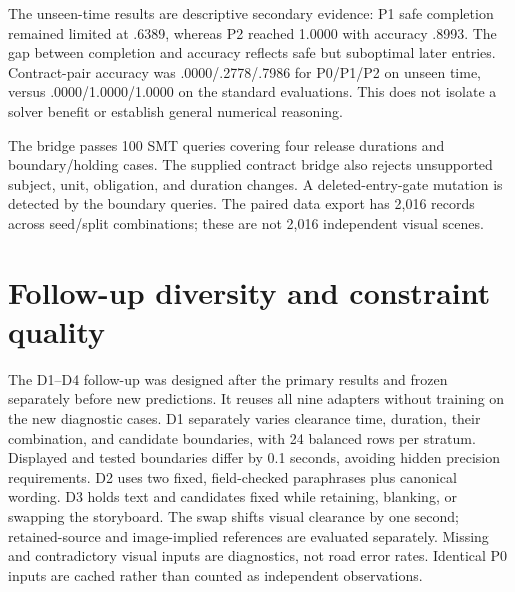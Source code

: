 \documentclass[11pt]{article}
\begin{document}
The unseen-time results are descriptive secondary evidence: P1 safe completion
remained limited at .6389, whereas P2 reached 1.0000 with accuracy .8993. The
gap between completion and accuracy reflects safe but suboptimal later entries.
Contract-pair accuracy was .0000/.2778/.7986 for P0/P1/P2 on unseen time, versus
.0000/1.0000/1.0000 on the standard evaluations. This does not isolate a solver
benefit or establish general numerical reasoning.

The bridge passes 100 SMT queries covering
four release durations and boundary/holding cases. The supplied contract bridge also rejects unsupported subject, unit, obligation,
and duration changes. A deleted-entry-gate mutation is detected by the boundary
queries. The paired data export has
2,016 records across seed/split combinations; these are not 2,016 independent
visual scenes.
\section{Follow-up diversity and constraint quality}
The D1--D4 follow-up was designed after the primary results and frozen separately
before new predictions. It reuses all nine adapters without training on the new
diagnostic cases. D1 separately varies clearance time, duration, their combination,
and candidate boundaries, with 24 balanced rows per stratum. Displayed and tested
boundaries differ by 0.1 seconds, avoiding hidden precision requirements. D2
uses two fixed, field-checked paraphrases plus canonical wording. D3 holds text
and candidates fixed while retaining, blanking, or swapping the storyboard.
The swap shifts visual clearance by one second; retained-source and image-implied
references are evaluated separately. Missing and contradictory visual inputs are
diagnostics, not road error rates. Identical P0 inputs are cached rather than
counted as independent observations.
\end{document}
